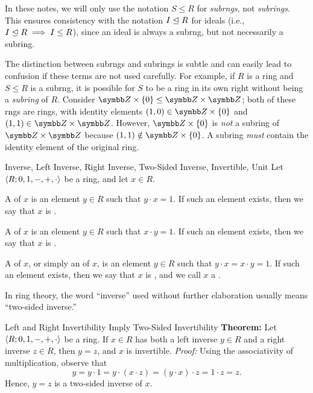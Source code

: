 In these notes, we will only use the notation $S \le R$ for \textit{subrngs}, not \textit{subrings}. This ensures consistency with the notation $I \trianglelefteq R$ for ideals (i.e., $I \trianglelefteq R \implies I \le R$), since an ideal is always a subrng, but not necessarily a subring.

The distinction between subrngs and subrings is subtle and can easily lead to confusion if these terms are not used carefully. For example, if $R$ is a ring and $S \le R$ is a subrng, it is possible for $S$ to be a ring in its own right without being a \textit{subring} of $R$. Consider $\Z \times \{0\} \le \Z \times \Z$; both of these rngs are rings, with identity elements $(1, 0) \in \Z \times \{0\}$ and $(1, 1) \in \Z \times \Z$. However, $\Z \times \{0\}$ is \textit{not} a subring of $\Z \times \Z$ because $(1, 1) \notin \Z \times \{0\}$. A subring \textit{must} contain the identity element of the original ring.

\begin{dfnbox}{Inverse, Left Inverse, Right Inverse, Two-Sided Inverse, Invertible, Unit}
	Let ${\langle {R; 0, 1, -, +, \cdot} \rangle}$ be a ring, and let $x \in R$.
	\begin{dfnitems}
		\item A  of $x$ is an element $y \in R$ such that $y \cdot x = 1$. If such an element exists, then we say that $x$ is .
		\item A  of $x$ is an element $y \in R$ such that $x \cdot y = 1$. If such an element exists, then we say that $x$ is .
		\item A  of $x$, or simply an  of $x$, is an element $y \in R$ such that $y \cdot x = x \cdot y = 1$. If such an element exists, then we say that $x$ is , and we call $x$ a .
	\end{dfnitems}
\end{dfnbox}

In ring theory, the word ``inverse'' used without further elaboration usually means ``two-sided inverse.''

\begin{thmbox}{Left and Right Invertibility Imply Two-Sided Invertibility}
	\textbf{Theorem:} Let ${\langle {R; 0, 1, -, +, \cdot} \rangle}$ be a ring. If $x \in R$ has both a left inverse $y \in R$ and a right inverse $z \in R$, then $y = z$, and $x$ is invertible.
	\tcblower
	\textit{Proof:} Using the associativity of multiplication, observe that
	\[ y = y \cdot 1 = y \cdot (x \cdot z) = (y \cdot x) \cdot z = 1 \cdot z = z. \]
	Hence, $y = z$ is a two-sided inverse of $x$.
\end{thmbox}

